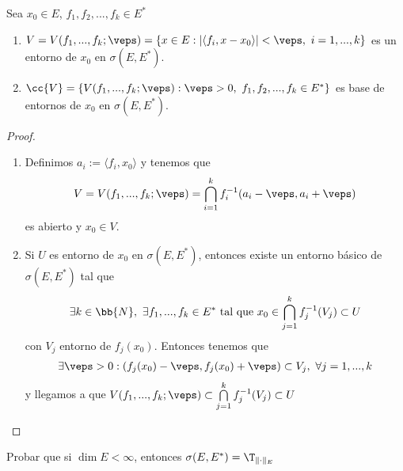 \begin{prop}
    Sea $x_0\in E$, $f_1,f_2,...,f_k\in E^*$
    \begin{enumerate}
        \item $V=V(f_1,...,f_k ; \veps) = \{x\in E : |\langle f_i,x-x_0\rangle | <\veps,\ i=1,...,k\}$ es un entorno de $x_0$ en $\sigma(E, E^*)$.
        \item $\cc{V} = \{V(f_1,...,f_k;\veps) : \veps >0,\ f_1,f_2,...,f_k\in E^*\}$ es base de entornos de $x_0$ en $\sigma(E, E^*)$.
    \end{enumerate}
    \begin{proof}\
        \begin{enumerate}
            \item Definimos $a_i:=\langle f_i,x_0\rangle$ y tenemos que
            \begin{gather*}
                V=V(f_1,...,f_k;\veps) = \bigcap\limits_{i=1}^{k} f_i^{-1}(a_i-\veps, a_i+\veps)
            \end{gather*}
            es abierto y $x_0 \in V$.

            \item Si $U$ es entorno de $x_0$ en $\sigma(E, E^*)$, entonces existe un entorno básico de $\sigma(E,E^*)$ tal que
            \begin{gather*}
                \exists k\in \bb{N},\ \exists f_1,...,f_k\in E^* \text{ tal que } x_0\in \bigcap\limits_{j=1}^k f_j^{-1}(V_j) \subset U
            \end{gather*}
            con $V_j$ entorno de $f_j(x_0)$. Entonces tenemos que 
            \begin{gather*}
                \exists \veps >0 : (f_j(x_0)-\veps, f_j(x_0)+\veps)\subset V_j,\ \forall j = 1,...,k
            \end{gather*}
            y llegamos a que $V(f_1,...,f_k;\veps) \subset \bigcap\limits_{j=1}^k f_j^{-1} (V_j)\subset U$
        \end{enumerate}
    \end{proof}
\end{prop}

\begin{ejercicio}
    Probar que si $\dim E <\infty$, entonces $\sigma(E,E^*)=\T_{\|\cdot\|_E}$
\end{ejercicio}